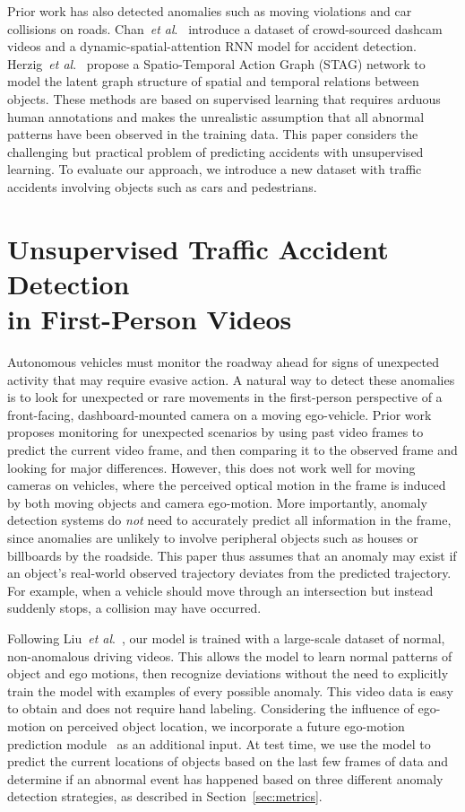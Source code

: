 \documentclass[letterpaper, 10 pt, conference]{ieeeconf}
\theoremstyle{definition}
\theoremstyle{remark}
\newcommand{\etal}{\textit{et al}.}
\begin{document}
Prior work has also detected anomalies such as moving violations and
car collisions on roads. Chan~\etal~\cite{chan2016anticipating}
introduce a dataset of crowd-sourced dashcam videos and a
dynamic-spatial-attention RNN model for accident detection.
Herzig~\etal~\cite{herzig2018classifying} propose a Spatio-Temporal
Action Graph (STAG) network to model the latent graph structure of spatial and temporal relations between objects. These
methods are based on supervised learning that requires
arduous human annotations and makes the unrealistic assumption that all
abnormal patterns have been observed in the training data.
This paper considers the challenging but practical problem
of predicting accidents with unsupervised learning.
To evaluate our approach, we introduce a new dataset with traffic
accidents involving objects such as cars and pedestrians.

 \section{Unsupervised Traffic Accident Detection\\in First-Person Videos}

Autonomous vehicles must monitor the roadway ahead for signs of
unexpected activity that may require evasive action. A natural way to detect these anomalies is to
look for unexpected or rare movements in the
first-person perspective of a front-facing, dashboard-mounted camera
on a moving ego-vehicle. Prior work~\cite{liu2018future}
proposes monitoring for unexpected scenarios by using past video frames to
predict the current video frame, and then comparing it to the
observed frame and looking for major differences. However, this does
not work well for moving cameras on vehicles, where the perceived
optical motion in the frame is induced by both moving objects and camera
ego-motion. More importantly, anomaly detection systems do \emph{not} need
to accurately predict all information in the frame, since anomalies
are unlikely to involve peripheral objects such as houses or
billboards by the roadside. This paper thus assumes that an anomaly may exist if an
object's real-world observed trajectory deviates from the predicted
trajectory. For example, when a vehicle should move through
an intersection but instead suddenly stops, a collision may have occurred.

Following Liu~\etal~\cite{liu2018future}, our model is trained with a
large-scale dataset of normal, non-anomalous driving videos. This
allows the model to learn normal patterns of object and ego motions,
 then recognize deviations without the need to
explicitly train the model with examples of every possible anomaly. This
video data is easy to obtain and does not require hand labeling.
Considering the influence of ego-motion on perceived object location, we incorporate a future ego-motion
prediction module~\cite{yao2018egocentric} as an additional input.
At test time, we use the model to predict the current locations of
objects based on the last few frames of data and determine if an
abnormal event has happened based on three different anomaly detection
strategies, as described in Section~\ref{sec:metrics}.
\end{document}
